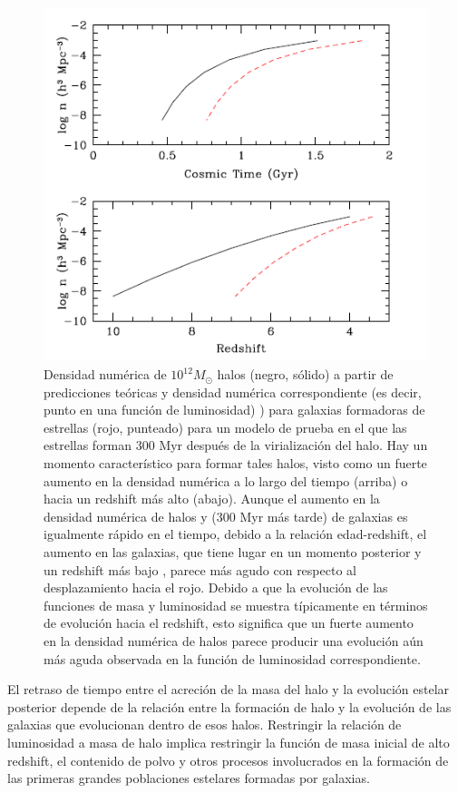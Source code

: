 \documentclass{article}
\begin{document}
\begin{figure}[t]
\begin{center}
\includegraphics[scale=0.65]{Figuras/steindhart_fig3}
\caption{\label{fig:steindhart_fig3}  Densidad numérica de $10^{12}M_\odot$ halos (negro, sólido) a partir de predicciones teóricas y densidad numérica correspondiente (es decir, punto en una función de luminosidad) ) para galaxias formadoras de estrellas (rojo, punteado) para un modelo de prueba en el que las estrellas forman 300 Myr después de la virialización del halo. Hay un momento característico para formar tales halos, visto como un fuerte aumento en la densidad numérica a lo largo del tiempo (arriba) o hacia un redshift más alto (abajo). Aunque el aumento en la densidad numérica de halos y (300 Myr más tarde) de galaxias es igualmente rápido en el tiempo, debido a la relación edad-redshift, el aumento en las galaxias, que tiene lugar en un momento posterior y un redshift más bajo , parece más agudo con respecto al desplazamiento hacia el rojo. Debido a que la evolución de las funciones de masa y luminosidad se muestra típicamente en términos de evolución hacia el redshift, esto significa que un fuerte aumento en la densidad numérica de halos parece producir una evolución aún más aguda observada en la función de luminosidad correspondiente.}
\end{center}
\end{figure}

El retraso de tiempo entre el acreción de la masa del halo y la evolución estelar posterior depende de la relación entre la formación de halo y la evolución de las galaxias que evolucionan dentro de esos halos. Restringir la relación de luminosidad a masa de halo implica restringir la función de masa inicial de alto redshift, el contenido de polvo y otros procesos involucrados en la formación de las primeras grandes poblaciones estelares formadas por galaxias.\\
\end{document}
